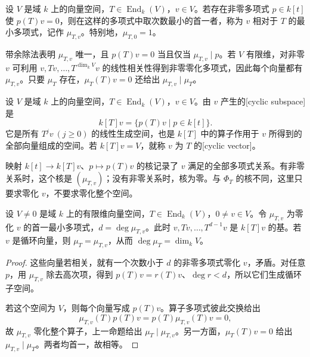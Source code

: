 \begin{definition}\label{b2:def:vector-minimal-polynomial}
	设 \(V\) 是域 \(k\) 上的向量空间，\(T\in\operatorname{End}_k(V)\)，\(v\in V\)。若存在非零多项式 \(p\in k[t]\) 使 \(p(T)v=0\)，则在这样的多项式中取次数最小的首一者，称为 \(v\) 相对于 \(T\) 的最小多项式，记作 \(\mu_{T,v}\)。特别地，\(\mu_{T,0}=1\)。
\end{definition}

带余除法表明 \(\mu_{T,v}\) 唯一，且 \(p(T)v=0\) 当且仅当 \(\mu_{T,v}\mid p\)。若 \(V\) 有限维，对非零 \(v\) 可利用 \(v,Tv,\ldots,T^{\dim_kV}v\) 的线性相关性得到非零零化多项式，因此每个向量都有 \(\mu_{T,v}\)。只要 \(\mu_T\) 存在，\(\mu_T(T)v=0\) 还给出 \(\mu_{T,v}\mid \mu_T\)。

\begin{definition}\label{b2:def:cyclic-vector}
	设 \(V\) 是域 \(k\) 上的向量空间，\(T\in\operatorname{End}_k(V)\)，\(v\in V\)。由 \(v\) 产生的[cyclic subspace]是
	\[
		k[T]v=\{p(T)v\mid p\in k[t]\}.
	\]
	它是所有 \(T^jv\ (j\ge0)\) 的线性生成空间，也是 \(k[T]\) 中的算子作用于 \(v\) 所得到的全部向量组成的空间。若 \(k[T]v=V\)，就称 \(v\) 为 \(T\) 的[cyclic vector]。
\end{definition}

映射 \(k[t]\to k[T]v\)、\(p\mapsto p(T)v\) 的核记录了 \(v\) 满足的全部多项式关系。有非零关系时，这个核是 \((\mu_{T,v})\)；没有非零关系时，核为零。与 \(\Phi_T\) 的核不同，这里只要求零化 \(v\)，不要求零化整个空间。

\begin{proposition}\label{b2:prop:cyclic-basis}
	设 \(V\ne0\) 是域 \(k\) 上的有限维向量空间，\(T\in\operatorname{End}_k(V)\)，\(0\ne v\in V\)。令 \(\mu_{T,v}\) 为零化 \(v\) 的首一最小多项式，\(d=\deg \mu_{T,v}\)。此时 \(v,Tv,\ldots,T^{d-1}v\) 是 \(k[T]v\) 的基。若 \(v\) 是循环向量，则 \(\mu_T=\mu_{T,v}\)，从而 \(\deg \mu_T=\dim_k V\)。
\end{proposition}
\begin{proof}
	这些向量若相关，就有一个次数小于 \(d\) 的非零多项式零化 \(v\)，矛盾。对任意 \(p\)，用 \(\mu_{T,v}\) 除去高次项，得到 \(p(T)v=r(T)v\)、\(\deg r<d\)，所以它们生成循环子空间。

	若这个空间为 \(V\)，则每个向量写成 \(p(T)v\)。算子多项式彼此交换给出
	\[
		\mu_{T,v}(T)p(T)v=p(T)\mu_{T,v}(T)v=0,
	\]
	故 \(\mu_{T,v}\) 零化整个算子，上一命题给出 \(\mu_T\mid \mu_{T,v}\)。另一方面，\(\mu_T(T)v=0\) 给出 \(\mu_{T,v}\mid \mu_T\)。两者均首一，故相等。
\end{proof}

